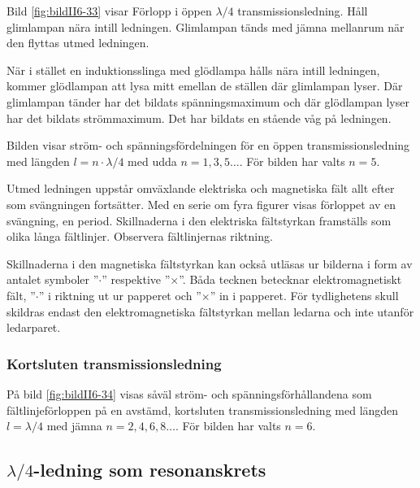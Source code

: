
Bild \ref{fig:bildII6-33} visar Förlopp i öppen $\lambda/4$
transmissionsledning.
Håll glimlampan nära intill ledningen.
Glimlampan tänds med jämna mellanrum när den flyttas utmed ledningen.

När i stället en induktionsslinga med glödlampa hålls nära intill ledningen,
kommer glödlampan att lysa mitt emellan de ställen där glimlampan lyser.
Där glimlampan tänder har det bildats spänningsmaximum och där glödlampan lyser
har det bildats strömmaximum.
Det har bildats en stående våg på ledningen.

Bilden visar ström- och spänningsfördelningen för en öppen transmissionsledning
med längden \(l = n\cdot\lambda/4\) med udda \(n = 1, 3, 5 \dots\).
För bilden har valts $n = 5$.

Utmed ledningen uppstår omväxlande elektriska och magnetiska fält allt
efter som svängningen fortsätter.
Med en serie om fyra figurer visas förloppet av en svängning, en period.
Skillnaderna i den elektriska fältstyrkan framställs som olika långa fältlinjer.
Observera fältlinjernas riktning.

Skillnaderna i den magnetiska fältstyrkan kan också utläsas ur
bilderna i form av antalet symboler ''\(\cdot\)'' respektive ''\(\times\)''.
Båda tecknen betecknar elektromagnetiskt fält, ''\(\cdot\)'' i riktning ut ur
papperet och ''\(\times\)'' in i papperet.
För tydlighetens skull skildras endast den elektromagnetiska fältstyrkan
mellan ledarna och inte utanför ledarparet.

\subsubsection{Kortsluten transmissionsledning}


På bild \ref{fig:bildII6-34} visas såväl ström- och spänningsförhållandena som
fältlinjeförloppen på en avstämd, kortsluten transmissionsledning med
längden \(l = \lambda/4\) med jämna \(n = 2, 4, 6, 8 \dots\).
För bilden har valts \(n = 6\).

\subsection{$\lambda/4$-ledning som resonanskrets}

